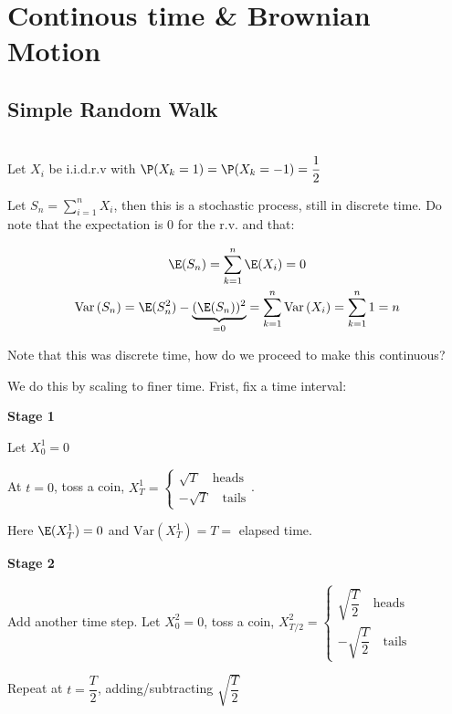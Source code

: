 \section{Continous time \& Brownian Motion}
\subsection{Simple Random Walk}\hfill\\
\noindent Let $X_i$ be i.i.d.r.v with $\P(X_k = 1)=\P(X_k = -1) = \dfrac{1}{2}$\par
\noindent Let $S_n = \sum_{i=1}^{n}X_i$, then this is a stochastic process, still in discrete time. Do note that the expectation is 0 for the r.v. and that:\par
\begin{equation*}
  \begin{gathered}
    \E(S_n) = \sum_{k=1}^{n}\E(X_i) = 0\\
    \text{Var}\left(S_n\right) = \E(S_n^2)-\underbrace{(\E(S_n))^2}_{\text{=0}} = \sum_{k=1}^{n}\text{Var}\left(X_i\right) = \sum_{k=1}^{n}1 = n
  \end{gathered}
\end{equation*}
\par\bigskip
\noindent Note that this was discrete time, how do we proceed to make this continuous?\par
\noindent We do this by scaling to finer time. Frist, fix a time interval:\par
\noindent\textbf{Stage 1}\par
\noindent Let $X_0^1 = 0$\par
At $t=0$, toss a coin, $X_T^1 = \begin{cases}\sqrt{T}\quad\text{heads}\\-\sqrt{T}\quad\text{tails}\end{cases}$.\par
\noindent Here $\E(X_T^1) = 0$ and $\text{Var}\left(X_T^1\right) = T = $ elapsed time.
\par\bigskip
\noindent\textbf{Stage 2}\par
\noindent Add another time step. Let $X_0^2 = 0$, toss a coin, $X_{T/2}^2 = \begin{cases}\sqrt{\dfrac{T}{2}}\quad\text{heads}\\-\sqrt{\dfrac{T}{2}}\quad\text{tails}\end{cases}$\par
\noindent Repeat at $t = \dfrac{T}{2}$, adding/subtracting $\sqrt{\dfrac{T}{2}}$
\par\bigskip
